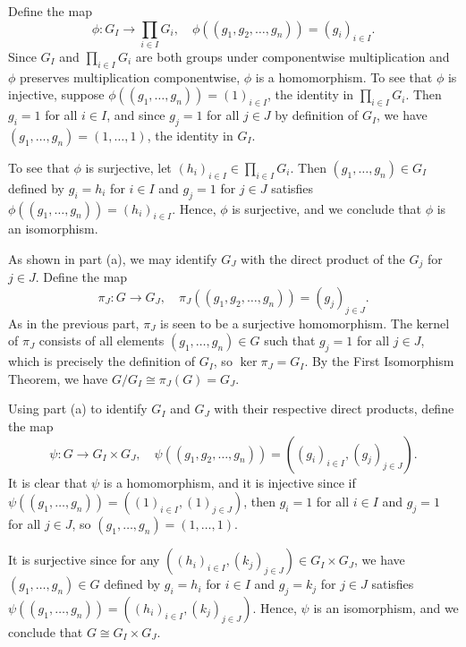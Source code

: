 \begin{solenum}
    \item Define the map
    \[
        \phi \colon G_I \to \prod_{i \in I} G_i, \quad \phi((g_1, g_2, \ldots, g_n)) = (g_i)_{i \in I}.
    \]
    Since $G_I$ and $\prod_{i \in I} G_i$ are both groups under componentwise multiplication and $\phi$ preserves multiplication componentwise, $\phi$ is a homomorphism.
    To see that $\phi$ is injective, suppose $\phi((g_1, \ldots, g_n)) = (1)_{i \in I}$, the identity in $\prod_{i \in I} G_i$.
    Then $g_i = 1$ for all $i \in I$, and since $g_j = 1$ for all $j \in J$ by definition of $G_I$, we have $(g_1, \ldots, g_n) = (1, \ldots, 1)$, the identity in $G_I$.

    To see that $\phi$ is surjective, let $(h_i)_{i \in I} \in \prod_{i \in I} G_i$.
    Then $(g_1, \ldots, g_n) \in G_I$ defined by $g_i = h_i$ for $i \in I$ and $g_j = 1$ for $j \in J$ satisfies $\phi((g_1, \ldots, g_n)) = (h_i)_{i \in I}$.
    Hence, $\phi$ is surjective, and we conclude that $\phi$ is an isomorphism.
    \item As shown in part (a), we may identify $G_J$ with the direct product of the $G_j$ for $j \in J$.
    Define the map
    \[
        \pi_J \colon G \to G_J, \quad \pi_J((g_1, g_2, \ldots, g_n)) = (g_j)_{j \in J}.
    \]
    As in the previous part, $\pi_J$ is seen to be a surjective homomorphism.
    The kernel of $\pi_J$ consists of all elements $(g_1, \ldots, g_n) \in G$ such that $g_j = 1$ for all $j \in J$, which is precisely the definition of $G_I$, so $\ker \pi_J = G_I$.
    By the First Isomorphism Theorem, we have $G/G_I \cong \pi_J(G) = G_J$.
    \item Using part (a) to identify $G_I$ and $G_J$ with their respective direct products, define the map
    \[
        \psi \colon G \to G_I \times G_J, \quad \psi((g_1, g_2, \ldots, g_n)) = ((g_i)_{i \in I}, (g_j)_{j \in J}).
    \]
    It is clear that $\psi$ is a homomorphism, and it is injective since if $\psi((g_1, \ldots, g_n)) = ((1)_{i \in I}, (1)_{j \in J})$, then $g_i = 1$ for all $i \in I$ and $g_j = 1$ for all $j \in J$, so $(g_1, \ldots, g_n) = (1, \ldots, 1)$.

    It is surjective since for any $((h_i)_{i \in I}, (k_j)_{j \in J}) \in G_I \times G_J$, we have $(g_1, \ldots, g_n) \in G$ defined by $g_i = h_i$ for $i \in I$ and $g_j = k_j$ for $j \in J$ satisfies $\psi((g_1, \ldots, g_n)) = ((h_i)_{i \in I}, (k_j)_{j \in J})$.
    Hence, $\psi$ is an isomorphism, and we conclude that $G \cong G_I \times G_J$.
\end{solenum}

